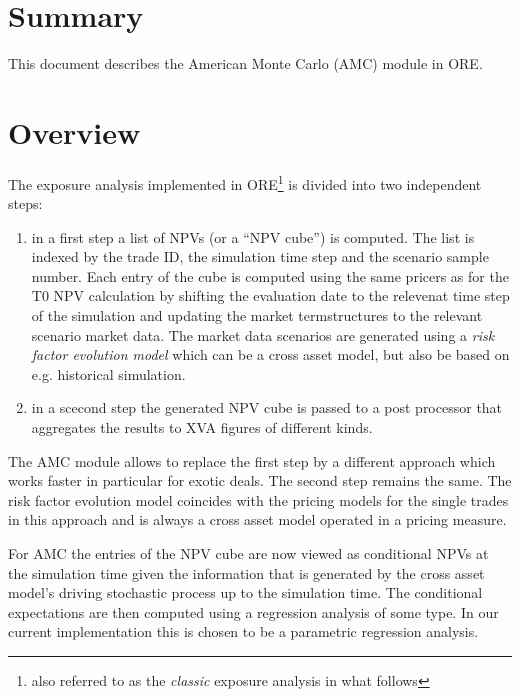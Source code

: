 \documentclass[12pt, a4paper]{article}
\begin{document}
\newpage

\section{Summary}

This document describes the American Monte Carlo (AMC) module in ORE.


\section{Overview}\label{overview}

The exposure analysis implemented in ORE\footnote{also referred to as the {\em classic} exposure analysis in what
  follows} is divided into two independent steps:

\begin{enumerate}
\item in a first step a list of NPVs (or a ``NPV cube'') is computed. The list is indexed by the trade ID, the
  simulation time step and the scenario sample number. Each entry of the cube is computed using the same pricers as for
  the T0 NPV calculation by shifting the evaluation date to the relevenat time step of the simulation and updating the
  market termstructures to the relevant scenario market data. The market data scenarios are generated using a {\em risk
    factor evolution model} which can be a cross asset model, but also be based on e.g. historical simulation.
\item in a scecond step the generated NPV cube is passed to a post processor that aggregates the results to XVA figures
  of different kinds.
\end{enumerate}

The AMC module allows to replace the first step by a different approach which works faster in particular for exotic
deals. The second step remains the same. The risk factor evolution model coincides with the pricing models for the
single trades in this approach and is always a cross asset model operated in a pricing measure.

For AMC the entries of the NPV cube are now viewed as conditional NPVs at the simulation time given the information that
is generated by the cross asset model's driving stochastic process up to the simulation time. The conditional
expectations are then computed using a regression analysis of some type. In our current implementation this is chosen to
be a parametric regression analysis.
\end{document}
